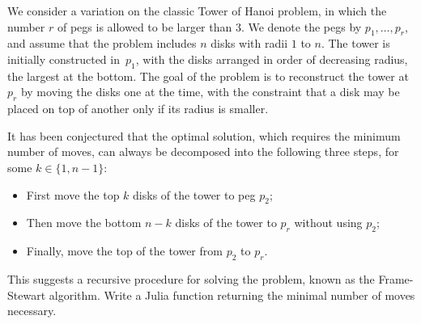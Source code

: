 \begin{task}
    We consider a variation on the classic Tower of Hanoi problem,
    in which the number $r$ of pegs is allowed to be larger than 3.
    We denote the pegs by $p_1, \dots, p_r$,
    and assume that the problem includes $n$ disks with radii $1$ to $n$.
    The tower is initially constructed in~$p_1$,
    with the disks arranged in order of decreasing radius, the largest at the bottom.
    The goal of the problem is to reconstruct the tower at $p_r$ by moving the disks one at the time,
    with the constraint that a disk may be placed on top of another only if its radius is smaller.

    It has been conjectured that the optimal solution,
    which requires the minimum number of moves,
    can always be decomposed into the following three steps,
    for some $k \in \{1, n-1\}$:
    \begin{itemize}
        \item First move the top $k$ disks of the tower to peg $p_2$;
        \item Then move the bottom $n-k$ disks of the tower to $p_r$ without using $p_2$;
        \item Finally, move the top of the tower from $p_2$ to $p_r$.
    \end{itemize}
    This suggests a recursive procedure for solving the problem, known as the Frame-Stewart algorithm.
    Write a Julia function  returning the minimal number of moves necessary.

\end{task}

